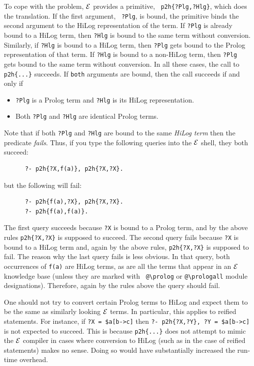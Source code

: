 \documentclass[11pt]{article}
\newcommand{\ERGO}{\mbox{\ensuremath{\cal{E}}\smaller{{\sc{RGO}}}}\xspace}
\newcommand{\FLSYSTEM}{\ERGO}
\newcommand{\bs}{\textbackslash}
\begin{document}
To cope with the problem, \FLSYSTEM provides a primitive, {\tt
  p2h\{?Plg,?Hlg\}}, which does the translation. If the first argument, {\tt
  ?Plg}, is bound, the primitive binds the second argument to the HiLog
representation of the term. If {\tt ?Plg} is already bound to a HiLog term,
then {\tt ?Hlg} is bound to the same term without conversion.  Similarly, if
{\tt ?Hlg} is bound to a HiLog term, then {\tt ?Plg} gets bound to the Prolog
representation of that term. If {\tt ?Hlg} is bound to a non-HiLog term,
then {\tt ?Plg} gets bound to the same term without conversion. In all these
cases, the call to {\tt p2h\{...\}} succeeds. If {\tt both} arguments are
bound, then the call succeeds if and only if
\begin{itemize}
\item {\tt ?Plg} is a Prolog term and {\tt ?Hlg} is its HiLog
  representation.
\item Both {\tt ?Plg} and {\tt ?Hlg} are identical Prolog terms.
\end{itemize}
Note that if both {\tt ?Plg} and {\tt ?Hlg} are bound to the same
\emph{HiLog term} then the predicate \emph{fails}. Thus, if you type the
following queries into the \FLSYSTEM shell, they both succeed:
\begin{verbatim}
      ?- p2h{?X,f(a)}, p2h{?X,?X}.
\end{verbatim}
but the following will fail:
\begin{verbatim}
      ?- p2h{f(a),?X}, p2h{?X,?X}.
      ?- p2h{f(a),f(a)}.
\end{verbatim}
The first query succeeds because {\tt ?X}  is bound to a Prolog term, and by the
above rules {\tt p2h\{?X,?X\}} is supposed to succeed. The second query fails
because {\tt ?X} is bound to a HiLog term and, again by the above rules,
{\tt p2h\{?X,?X\}} is supposed to fail.
The reason why the last query fails is less obvious.
In that query, both occurrences of {\tt f(a)} are HiLog terms, as are all the
terms that appear in an \FLSYSTEM knowledge base (unless they are marked with {\tt
  @\bs{}prolog} or {\tt @\bs{}prologall} module designations). Therefore, again by
the rules above the query should fail.

One should not try to convert certain Prolog terms to
HiLog and expect them to be the same as similarly looking \FLSYSTEM terms. In
particular, this applies to reified statements. For instance, if {\tt ?X =
\${a[b->c]}} then {\tt ?- p2h\{?X,?Y\}, ?Y = \${a[b->c]}} is not expected to
succeed. This is because {\tt p2h\{...\}} does not attempt to mimic the \FLSYSTEM
compiler in cases where conversion to HiLog (such as in the case of reified
statements) makes no sense. Doing so would have substantially increased the
run-time overhead.
\end{document}
